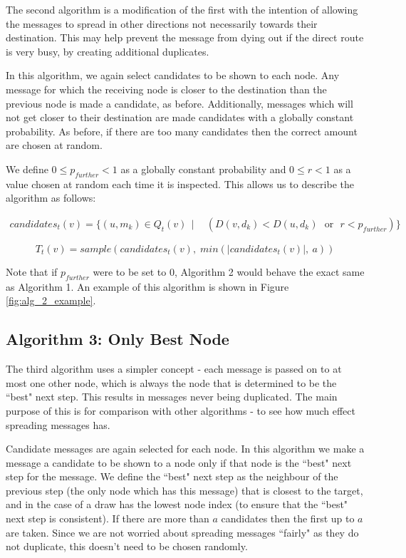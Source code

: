 \documentclass[bsc,frontabs,twoside,singlespacing,parskip,deptreport]{infthesis}     %
\begin{document}
The second algorithm is a modification of the first with the intention of allowing the messages to spread in other directions not necessarily towards their destination. This may help prevent the message from dying out if the direct route is very busy, by creating additional duplicates.

In this algorithm, we again select candidates to be shown to each node. Any message for which the receiving node is closer to the destination than the previous node is made a candidate, as before. Additionally, messages which will not get closer to their destination are made candidates with a globally constant probability. As before, if there are too many candidates then the correct amount are chosen at random.

We define $0 \leq p_{further} < 1$ as a globally constant probability and $0 \leq r < 1$ as a value chosen at random each time it is inspected. This allows us to describe the algorithm as follows:

\begin{equation}
\begin{split}
candidates_{t}(v) = \{ (u, m_{k}) \in Q_{t}(v) \:\: | \:\: & (D(v, d_{k}) < D(u, d_{k}) \:\:\: \text{or} \:\:\: r < p_{further}) \}
\end{split}
\end{equation}

\begin{equation}
T_{t}(v) = \mathit{sample}(candidates_{t}(v), \; \mathit{min}(|candidates_{t}(v)|, \: a))
\end{equation}

Note that if $p_{further}$ were to be set to 0, Algorithm 2 would behave the exact same as Algorithm 1. An example of this algorithm is shown in Figure \ref{fig:alg_2_example}.

\subsection{Algorithm 3: Only Best Node}

The third algorithm uses a simpler concept - each message is passed on to at most one other node, which is always the node that is determined to be the ``best" next step. This results in messages never being duplicated. The main purpose of this is for comparison with other algorithms - to see how much effect spreading messages has.

Candidate messages are again selected for each node. In this algorithm we make a message a candidate to be shown to a node only if that node is the ``best" next step for the message. We define the ``best" next step as the neighbour of the previous step (the only node which has this message) that is closest to the target, and in the case of a draw has the lowest node index (to ensure that the ``best" next step is consistent). If there are more than $a$ candidates then the first up to $a$ are taken. Since we are not worried about spreading messages ``fairly" as they do not duplicate, this doesn't need to be chosen randomly. 
\end{document}
